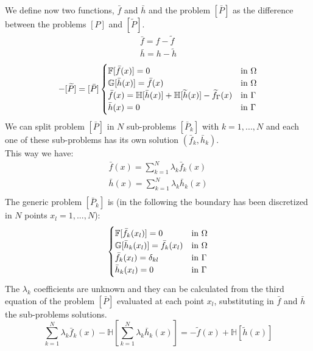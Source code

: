We define now two functions, $\bar f$ and $\bar h$ and the problem $[\bar P]$ as the difference between the problems $[P]$ and $[\widetilde{P}]$.
\[
\begin{array}{l}
\bar f=f-\widetilde{f}\\[1ex]
\bar h=h-\widetilde{h}
\end{array}
\]
\begin{equation}
[P]-[\widetilde{P}]=[\bar P]
\begin{cases}
\mathbb{F}[\bar f(x)]=0 & \textnormal{in }\Omega\\
\mathbb{G}[\bar h(x)]=\bar f(x) & \textnormal{in }\Omega\\
\bar f(x)=\mathbb{H}[\bar h(x)]+\mathbb{H}[\widetilde{h}(x)]-\widetilde{f}_\Gamma(x)& \textnormal{in }\Gamma\\
\bar h(x)=0 &\textnormal{in }\Gamma\\
\end{cases}
\end{equation}
We can split problem $[\bar P]$ in $N$ sub-problems $[\bar P_k]$ with $k=1,...,N$ and each one of these sub-problems has its own solution $(\bar f_k, \bar h_k)$.\\
This way we have:
\[
\begin{array}{l}
\bar f(x)=\sum\limits_{k=1}^N \lambda_k\bar f_k(x)\\[2ex]
\bar h(x)=\sum\limits_{k=1}^N \lambda_k\bar h_k(x)\\
\end{array}
\]
The generic problem $[\bar P_k]$ is (in the following the boundary has been discretized in $N$ points $x_l=1,...,N$):
\begin{equation}
[\bar P_k]
\begin{cases}
\mathbb{F}[\bar f_k(x_l)]=0 & \textnormal{in }\Omega\\
\mathbb{G}[\bar h_k(x_l)]=\bar f_k(x_l) & \textnormal{in }\Omega\\
\bar f_k(x_l)=\delta_{kl} & \textnormal{in }\Gamma\\
\bar h_k(x_l)=0 &\textnormal{in }\Gamma\\
\end{cases}
\end{equation}
The $\lambda_k$ coefficients are unknown and they can be calculated from the third equation of the problem $[\bar P]$ evaluated at each point $x_l$, substituting in $\bar f$ and $\bar h$ the sub-problems solutions.
\[
\sum_{k=1}^N\lambda_k\bar f_k(x)-\mathbb{H}\left[\sum_{k=1}^N\lambda_k \bar h_k(x) \right] =-\widetilde{f}(x)+\mathbb{H}[\widetilde{h}(x)]
\]
